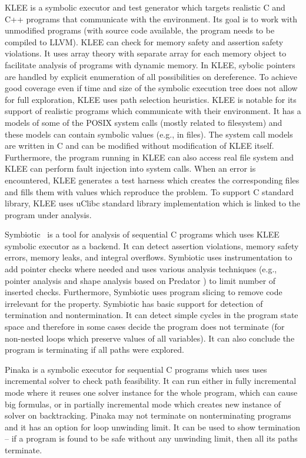 KLEE  is a symbolic executor and test generator which targets realistic C and C++ programs that communicate with the environment.
Its goal is to work with unmodified programs (with source code available, the program needs to be compiled to LLVM).
KLEE can check for memory safety and assertion safety violations.
It uses array theory with separate array for each memory object to facilitate analysis of programs with dynamic memory.
In KLEE, sybolic pointers are handled by explicit enumeration of all possibilities on dereference.
To achieve good coverage even if time and size of the symbolic execution tree does not allow for full exploration, KLEE uses path selection heuristics.
KLEE is notable for its support of realistic programs which communicate with their environment.
It has a models of some of the POSIX system calls (mostly related to filesystem) and these models can contain symbolic values (e.g., in files).
The system call models are written in C and can be modified without modification of KLEE itself.
Furthermore, the program running in KLEE can also access real file system and KLEE can perform fault injection into system calls.
When an error is encountered, KLEE generates a test harness which creates the corresponding files and fills them with values which reproduce the problem.
To support C standard library, KLEE uses uClibc standard library implementation which is linked to the program under analysis.

Symbiotic~ is a tool for analysis of sequential C programs which uses KLEE symbolic executor as a backend.
It can detect assertion violations, memory safety errors, memory leaks, and integral overflows.
Symbiotic uses instrumentation to add pointer checks where needed and uses various analysis techniques (e.g., pointer analysis and shape analysis based on Predator ) to limit number of inserted checks.
Furthermore, Symbiotic uses program slicing to remove code irrelevant for the property.
Symbiotic has basic support for detection of termination and nontermination.
It can detect simple cycles in the program state space and therefore in some cases decide the program does not terminate (for non-nested loops which preserve values of all variables).
It can also conclude the program is terminating if all paths were explored.

Pinaka  is a symbolic executor for sequential C programs which uses uses incremental solver to check path feasibility.
It can run either in fully incremental mode where it reuses one solver instance for the whole program, which can cause big formulas, or in partially incremental mode which creates new instance of solver on backtracking.
Pinaka may not terminate on nonterminating programs and it has an option for loop unwinding limit.
It can be used to show termination -- if a program is found to be safe without any unwinding limit, then all its paths terminate.

